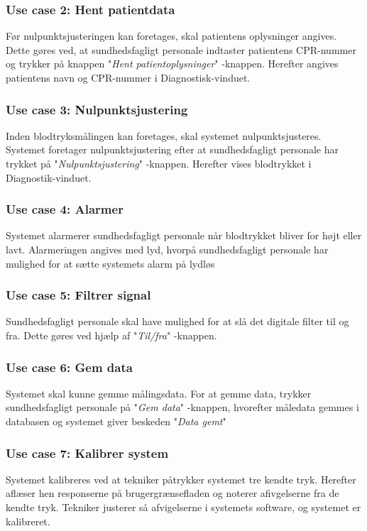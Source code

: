 \subsubsection{Use case 2: Hent patientdata}
Før nulpunktsjusteringen kan foretages, skal patientens oplysninger angives. Dette gøres ved, at sundhedsfagligt personale indtaster patientens CPR-nummer og trykker på knappen "\textit{Hent patientoplysninger}"\- -knappen. Herefter angives patientens navn og CPR-nummer i Diagnostisk-vinduet. 

\subsubsection{Use case 3: Nulpunktsjustering}
Inden blodtryksmålingen kan foretages, skal systemet nulpunktsjusteres. Systemet foretager nulpunktsjustering efter at sundhedsfagligt personale har trykket på "\textit{Nulpunktsjustering}"\- -knappen. Herefter vises blodtrykket i Diagnostik-vinduet.

\subsubsection{Use case 4: Alarmer}
Systemet alarmerer sundhedsfagligt personale når blodtrykket bliver for højt eller lavt. Alarmeringen angives med lyd, hvorpå sundhedsfagligt personale har mulighed for at sætte systemets alarm på lydløs 

\subsubsection{Use case 5: Filtrer signal}
Sundhedsfagligt personale skal have mulighed for at slå det digitale filter til og fra. Dette gøres ved hjælp af "\textit{Til/fra}"\- -knappen.

\subsubsection{Use case 6: Gem data}
Systemet skal kunne gemme målingsdata. For at gemme data, trykker sundhedsfagligt personale på "\textit{Gem data}"\- -knappen, hvorefter måledata gemmes i databasen og systemet giver beskeden "\textit{Data gemt}"

\subsubsection{Use case 7: Kalibrer system}
Systemet kalibreres ved at tekniker påtrykker systemet tre kendte tryk. Herefter aflæser hen responserne på brugergrænsefladen og noterer afivgelserne fra de kendte tryk. Tekniker justerer så afvigelserne i systemets software, og systemet er kalibreret. 

